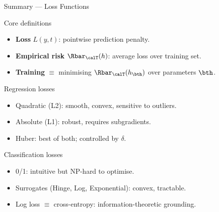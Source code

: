 \begin{frame}{Summary — Loss Functions}
  \begin{block}{Core definitions}
    \begin{itemize}
      \item \textbf{Loss} $L(y,t)$: pointwise prediction penalty.
      \item \textbf{Empirical risk} $\Rbar_{\calT}(h)$: average loss over training set.
      \item \textbf{Training} $\equiv$ minimising $\Rbar_{\calT}(h_{\bth})$ over parameters $\bth$.
    \end{itemize}
  \end{block}
  \begin{block}{Regression losses}
    \begin{itemize}
      \item Quadratic (L2): smooth, convex, sensitive to outliers.
      \item Absolute (L1): robust, requires subgradients.
      \item Huber: best of both; controlled by $\delta$.
    \end{itemize}
  \end{block}
  \begin{block}{Classification losses}
    \begin{itemize}
      \item 0/1: intuitive but NP-hard to optimise.
      \item Surrogates (Hinge, Log, Exponential): convex, tractable.
      \item Log loss $\equiv$ cross-entropy: information-theoretic grounding.
    \end{itemize}
  \end{block}
\end{frame}


